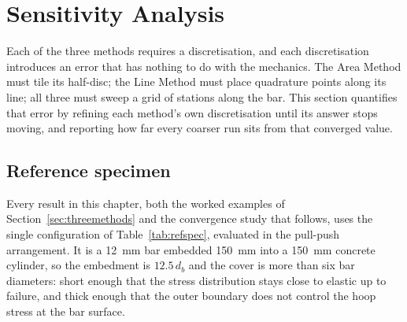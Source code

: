 \section{Sensitivity Analysis}
\label{sec:sensitivity}
 
Each of the three methods requires a discretisation, and each discretisation
introduces an error that has nothing to do with the mechanics. The Area
Method must tile its half-disc; the Line Method must place quadrature points
along its line; all three must sweep a grid of stations along the bar. This
section quantifies that error by refining each method's own discretisation
until its answer stops moving, and reporting how far every coarser run sits
from that converged value.
 
\subsection{Reference specimen}
\label{sec:refspec}
 
Every result in this chapter, both the worked examples of
Section~\ref{sec:threemethods} and the convergence study that follows, uses
the single configuration of Table~\ref{tab:refspec}, evaluated in the
pull-push arrangement. It is a \SI{12}{\milli\metre} bar embedded
\SI{150}{\milli\metre} into a \SI{150}{\milli\metre} concrete cylinder, so
the embedment is $12.5\,d_b$ and the cover is more than six bar diameters:
short enough that the stress distribution stays close to elastic up to
failure, and thick enough that the outer boundary does not control the hoop
stress at the bar surface.
 
